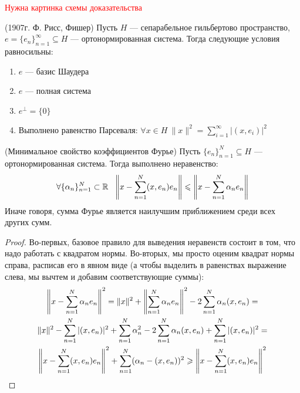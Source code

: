 \textcolor{red}{Нужна картинка схемы доказательства}

\begin{theorem} (1907г. Ф. Рисс, Фишер)
	Пусть $H$ --- сепарабельное гильбертово пространство, $e = \{e_n\}_{n = 1}^\infty \subseteq H$ --- ортонормированная система. Тогда следующие условия равносильны:
	\begin{enumerate}
		\item $e$ --- базис Шаудера
		
		\item $e$ --- полная система
		
		\item $e^\bot = \{0\}$
		
		\item Выполнено равенство Парсеваля: $\forall x \in H\ \|x\|^2 = \sum_{i = 1}^\infty |(x, e_i)|^2$
	\end{enumerate}
\end{theorem}

\begin{lemma} (Минимальное свойство коэффициентов Фурье)
	Пусть $\{e_n\}_{n = 1}^N \subseteq H$ --- ортонормированная система. Тогда выполнено неравенство:
	\[
	\forall \{\alpha_n\}_{n = 1}^N \subset \R\ \ \no{x - \sum_{n = 1}^N (x, e_n)e_n} \le \no{x - \sum_{n = 1}^N \alpha_n e_n}
	\]
	Иначе говоря, сумма Фурье является наилучшим приближением среди всех других сумм.
\end{lemma}

\begin{proof}
	Во-первых, базовое правило для выведения неравенств состоит в том, что надо работать с квадратом нормы. Во-вторых, мы просто оценим квадрат нормы справа, расписав его в явном виде (а чтобы выделить в равенствах выражение слева, мы вычтем и добавим соответствующие суммы):
	\begin{multline*}
	\left\|x - \sum_{n = 1}^N \alpha_n e_n\right\|^2 = \|x\|^2 + \left\|\sum_{n = 1}^N \alpha_n e_n\right\|^2 - 2\sum_{n = 1}^N \alpha_n (x, e_n) =
	\\
	\|x\|^2 - \sum_{n = 1}^N |(x, e_n)|^2 + \sum_{n = 1}^N \alpha_n^2 - 2\sum_{n = 1}^N \alpha_n(x, e_n) + \sum_{n = 1}^N |(x, e_n)|^2 =
	\\
	\left\|x - \sum_{n = 1}^N (x, e_n)e_n\right\|^2 + \sum_{n = 1}^N (\alpha_n - (x, e_n))^2 \geqslant \left\|x - \sum_{n = 1}^N (x, e_n)e_n\right\|^2
	\end{multline*}
\end{proof}

